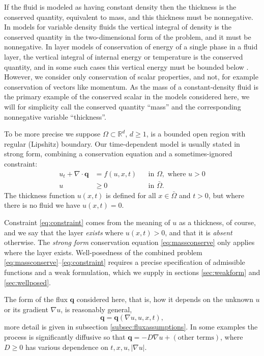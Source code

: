 \documentclass[final,leqno,onefignum,onetabnum]{siamltex1213bueler}
\newcommand\bq{\mathbf{q}}
\newcommand{\Div}{\nabla\cdot}
\renewcommand{\grad}{\nabla}
\newcommand\RR{\mathbb{R}}
\begin{document}
If the fluid is modeled as having constant density then the thickness is the conserved quantity, equivalent to mass, and this thickness must be nonnegative.  In models for variable density fluids the vertical integral of density is the conserved quantity in the two-dimensional form of the problem, and it must be nonnegative.  In layer models of conservation of energy of a single phase in a fluid layer, the vertical integral of internal energy or temperature is the conserved quantity, and in some such cases this vertical energy must be bounded below \cite{Aschwandenetal2012}.  However, we consider only conservation of scalar properties, and not, for example conservation of vectors like momentum.  As the mass of a constant-density fluid is the primary example of the conserved scalar in the models considered here, we will for simplicity call the conserved quantity ``mass'' and the corresponding nonnegative variable ``thickness''.

To be more precise we suppose $\Omega \subset \RR^d$, $d\ge 1$, is a bounded open region with regular (Lipshitz) boundary.  Our time-dependent model is usually stated in strong form, combining a conservation equation and a sometimes-ignored constraint:
\begin{align}
u_t + \Div \bq &= f(u,x,t) &&\text{in } \Omega, \text{ where } u > 0 \label{eq:massconserve} \\
u &\ge 0 &&\text{in } \bar\Omega. \label{eq:constraint}
\end{align}
The thickness function $u(x,t)$ is defined for all $x\in \bar\Omega$ and $t>0$, but where there is no fluid we have $u(x,t)=0$.

Constraint \eqref{eq:constraint} comes from the meaning of $u$ as a thickness, of course, and we say that the layer \emph{exists} where $u(x,t)>0$, and that it is \emph{absent} otherwise.  The \emph{strong form} conservation equation \eqref{eq:massconserve} only applies where the layer exists.  Well-posedness of the combined problem \eqref{eq:massconserve}--\eqref{eq:constraint} requires a precise specification of admissible functions and a weak formulation, which we supply in sections \ref{sec:weakform} and \ref{sec:wellposed}.

The form of the flux $\bq$ considered here, that is, how it depends on the unknown $u$ or its gradient $\grad u$, is reasonably general,
\begin{equation}
\bq = \bq(\grad u,u,x,t), \label{eq:fluxdepends}
\end{equation}
more detail is given in subsection \ref{subsec:fluxassumptions}.  In some examples the process is significantly diffusive so that $\bq=- D \grad u + (\text{other terms})$, where $D\ge 0$ has various dependence on $t,x,u,|\grad u|$.
\end{document}
